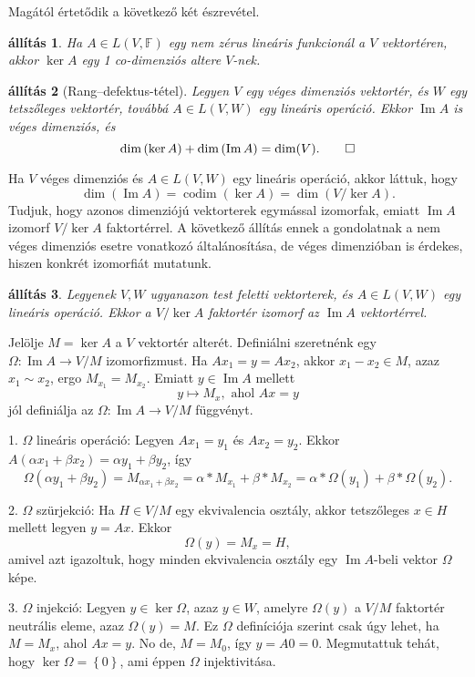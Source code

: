 \documentclass[9pt, a4paper, showtrims]{memoir}
\makeatletter
\renewenvironment{proof}[1][\proofname]
    {\par\pushQED{\qed}%
    \normalfont \topsep6\p@\@plus6\p@\relax
    \trivlist
    \item[\hskip\labelsep
        \itshape
    #1\@addpunct{:}]\ignorespaces}
    {\popQED\endtrivlist\@endpefalse}
\theoremstyle{plain}
\newtheorem{proposition}{állítás}[chapter]
\theoremstyle{remark}
\theoremstyle{definition}
\DeclareMathOperator{\codim}{codim}
\DeclareMathOperator{\im}{Im}
\makeatother
\begin{document}
Magától értetődik a következő két észrevétel.
\begin{proposition}
	Ha $A\in L\left( V,\mathbb{F} \right)$ egy nem zérus lineáris funkcionál a $V$ vektortéren,
	akkor $\ker A$ egy 1 co-dimenziós altere $V$-nek.
\end{proposition}
\begin{proposition}[Rang--defektus-tétel]
	Legyen $V$ egy véges dimenziós vektortér,
	és $W$ egy tetszőleges vektortér,
	továbbá $A\in L\left( V,W \right)$ egy lineáris operáció.
	Ekkor
	$\im A$ is véges dimenziós, és
	\[
		\dim\left( \ker A \right)+\dim\left( \im A \right)=\dim(V).\qedhere
	\]
\end{proposition}

Ha $V$ véges dimenziós és $A\in L\left( V,W \right)$ egy lineáris operáció,
akkor láttuk, hogy
\[
	\dim\left( \im A \right)
	=
	\codim\left( \ker A \right)
	=
	\dim\left( V/\ker A \right).
\]
Tudjuk, hogy azonos dimenziójú vektorterek egymással izomorfak,
emiatt $\im A$ izomorf $V/\ker A$ faktortérrel.
A következő állítás ennek a gondolatnak a nem véges dimenziós esetre vonatkozó általánosítása,
de véges dimenzióban is érdekes, hiszen konkrét izomorfiát mutatunk.
\begin{proposition}
	Legyenek $V,W$ ugyanazon test feletti vektorterek,
	és $A\in L\left( V,W \right)$ egy lineáris operáció.
	Ekkor a
	\(
	V/\ker A
	\)
	faktortér izomorf az $\im A$ vektortérrel.
\end{proposition}
\begin{proof}
	Jelölje $M=\ker A$ a $V$ vektortér alterét.
	Definiálni szeretnénk egy $\Omega:\im A\to V/M$ izomorfizmust.
	Ha $Ax_1=y=Ax_2$, akkor $x_1-x_2\in M$, azaz $x_1\sim x_2$, ergo $M_{x_1}=M_{x_2}$.
	Emiatt $y\in\im A$ mellett
	\[
		y\mapsto M_x, \text{ ahol } Ax=y
	\]
	jól definiálja az $\Omega:\im A\to V/M$ függvényt.

	1. $\Omega$ lineáris operáció:
	Legyen $Ax_1=y_1$ és $Ax_2=y_2$.
	Ekkor
	$A\left( \alpha x_1+\beta x_2 \right)=\alpha y_1+\beta y_2$, így
	\[
		\Omega\left( \alpha y_1+\beta y_2 \right)
		=
		M_{\alpha x_1+\beta x_2}
		=
		\alpha\ast M_{x_1}+\beta\ast M_{x_2}
		=
		\alpha\ast \Omega\left( y_1 \right)+\beta\ast\Omega\left( y_2 \right).
	\]

	2. $\Omega$ szürjekció:
	Ha $H\in V/M$ egy ekvivalencia osztály,
	akkor tetszőleges $x\in H$ mellett legyen $y=Ax$.
	Ekkor
	\[
		\Omega\left( y \right)=M_x=H,
	\]
	amivel azt igazoltuk,
	hogy minden ekvivalencia osztály egy $\im A$-beli vektor $\Omega$ képe.


	3. $\Omega$ injekció:
	Legyen $y\in\ker\Omega$, azaz $y\in W$, amelyre $\Omega\left( y \right)$ a $V/M$ faktortér neutrális eleme,
	azaz
	$\Omega\left( y \right)=M$.
	Ez $\Omega$ definíciója szerint csak úgy lehet, ha $M=M_x$, ahol $Ax=y$.
	No de, $M=M_0$, így $y=A0=0$.
	Megmutattuk tehát, hogy $\ker \Omega=\left\{ 0 \right\}$,
	ami éppen $\Omega$ injektivitása.
\end{proof}
\end{document}
